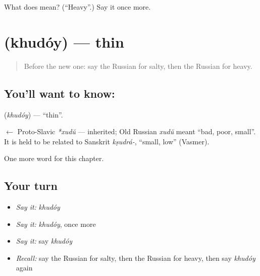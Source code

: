 \begin{tcolorbox}[breakable,colback=teal!4,colframe=teal!35!black,title={Before you move on}]
What does  mean? (\textquotedblleft{}Heavy\textquotedblright{}.) Say it once more.
\end{tcolorbox}
\section[\texorpdfstring{\ru{худой} (khudóy)}{худой (khudóy)}]{ (khudóy) — thin}

\label{lesson:RU-C130-thin}



\begin{quote}
Before the new one: say the Russian for salty, then the Russian for heavy.
\end{quote}

\subsection*{You'll want to know: }
\textbf{} (\emph{khudóy}) — \textquotedblleft{}thin\textquotedblright{}.

\begin{cousinweb}
\textbf{} $\leftarrow$ Proto-Slavic \emph{*xudŭ} — inherited; Old Russian \emph{xudŭ} meant \textquotedblleft{}bad, poor, small\textquotedblright{}. It is held to be related to Sanskrit \emph{kṣudrá-}, \textquotedblleft{}small, low\textquotedblright{} (Vasmer).
\end{cousinweb}

\begin{grammarlens}[title={What you've built}]
One more word for this chapter.
\end{grammarlens}

\subsection*{Your turn}
\begin{itemize}
\raggedright
  \item \emph{Say it:} \emph{khudóy}
  \item \emph{Say it:} \emph{khudóy}, once more
  \item \emph{Say it:} say \emph{khudóy}
  \item \emph{Recall:} say the Russian for salty, then the Russian for heavy, then say \emph{khudóy} again
\end{itemize}

